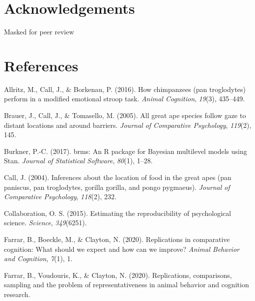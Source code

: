 \documentclass[10pt, letterpaper]{article}
\begin{document}
\hypertarget{acknowledgements}{%
\section{Acknowledgements}\label{acknowledgements}}

Masked for peer review

\hypertarget{references}{%
\section{References}\label{references}}

\setlength{\parindent}{-0.1in} 
\setlength{\leftskip}{0.125in}

\noindent

\hypertarget{refs}{}


\leavevmode\hypertarget{ref-allritz2016chimpanzees}{}%
Allritz, M., Call, J., \& Borkenau, P. (2016). How chimpanzees (pan
troglodytes) perform in a modified emotional stroop task. \emph{Animal
Cognition}, \emph{19}(3), 435--449.

\leavevmode\hypertarget{ref-brauer2005all}{}%
Brauer, J., Call, J., \& Tomasello, M. (2005). All great ape species
follow gaze to distant locations and around barriers. \emph{Journal of
Comparative Psychology}, \emph{119}(2), 145.

\leavevmode\hypertarget{ref-R-brms_a}{}%
Burkner, P.-C. (2017). {brms}: An {R} package for {Bayesian} multilevel
models using {Stan}. \emph{Journal of Statistical Software},
\emph{80}(1), 1--28.

\leavevmode\hypertarget{ref-call2004inferences}{}%
Call, J. (2004). Inferences about the location of food in the great apes
(pan paniscus, pan troglodytes, gorilla gorilla, and pongo pygmaeus).
\emph{Journal of Comparative Psychology}, \emph{118}(2), 232.

\leavevmode\hypertarget{ref-open2015estimating}{}%
Collaboration, O. S. (2015). Estimating the reproducibility of
psychological science. \emph{Science}, \emph{349}(6251).

\leavevmode\hypertarget{ref-farrar2020replicomp}{}%
Farrar, B., Boeckle, M., \& Clayton, N. (2020). Replications in
comparative cognition: What should we expect and how can we improve?
\emph{Animal Behavior and Cognition}, \emph{7}(1), 1.

\leavevmode\hypertarget{ref-farrar2020replications}{}%
Farrar, B., Voudouris, K., \& Clayton, N. (2020). Replications,
comparisons, sampling and the problem of representativeness in animal
behavior and cognition research.
\end{document}
